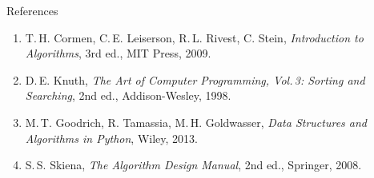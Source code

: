 \documentclass[9pt,aspectratio=169]{beamer}
\begin{document}
\begin{frame}[plain]
\end{frame}

\begin{frame}{References}
\footnotesize
\begin{enumerate}
  \item T.\,H. Cormen, C.\,E. Leiserson, R.\,L. Rivest, C. Stein, \textit{Introduction to Algorithms}, 3rd ed., MIT Press, 2009.
  \item D.\,E. Knuth, \textit{The Art of Computer Programming, Vol.\,3: Sorting and Searching}, 2nd ed., Addison-Wesley, 1998.
  \item M.\,T. Goodrich, R. Tamassia, M.\,H. Goldwasser, \textit{Data Structures and Algorithms in Python}, Wiley, 2013.
  \item S.\,S. Skiena, \textit{The Algorithm Design Manual}, 2nd ed., Springer, 2008.
\end{enumerate}
\end{frame}
\end{document}
